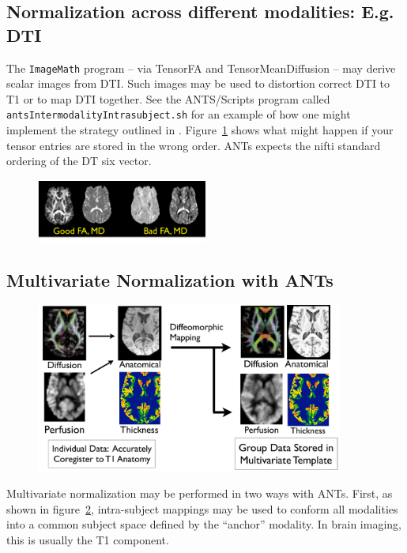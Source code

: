 \documentclass{InsightArticle}
\begin{document}
\subsection{Normalization across different modalities: E.g. DTI}
The \texttt{ImageMath} program -- via TensorFA and TensorMeanDiffusion -- 
may derive scalar images from DTI.  Such images may be used to 
distortion correct DTI to T1 or to map DTI together.   See the 
ANTS/Scripts program called \texttt{antsIntermodalityIntrasubject.sh}
for an example of how one might implement the strategy outlined in \cite{Tustison2014}.   Figure~\ref{fig:dterr} shows what might 
happen if your tensor entries are stored in the wrong order. 
ANTs expects the nifti standard ordering of the DT six vector.
\begin{figure}
\includegraphics[width=0.5\textwidth]{Figures/dtiordererr.pdf} 
\vspace{-0.1in}
\label{fig:dterr}
\end{figure}  
\subsection{Multivariate Normalization with ANTs}
\begin{figure}
\includegraphics[width=0.9\textwidth]{Figures/multivariatenorm.pdf} 
\vspace{-0.1in}
\label{fig:mvnorm}
\end{figure}
Multivariate normalization may be performed in two ways with ANTs.  
First, as shown in figure~\ref{fig:mvnorm}, intra-subject mappings may 
be used to conform all modalities into a common subject space defined by 
the ``anchor'' modality.  In brain imaging, this is usually the T1 component.  
\end{document}
